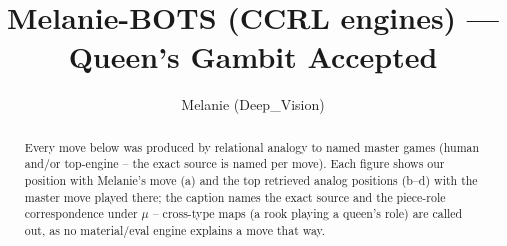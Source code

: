 \documentclass[11pt]{article}
\title{Melanie-BOTS (CCRL engines) — Queen's Gambit Accepted}
\author{Melanie (Deep\_Vision)}
\date{}
\begin{document}
\maketitle

\begin{abstract}Every move below was produced by relational analogy to named master games (human and/or top-engine -- the exact source is named per move). Each figure shows our position with Melanie's move (a) and the top retrieved analog positions (b--d) with the master move played there; the caption names the exact source and the piece-role correspondence under $\mu$ -- cross-type maps (a rook playing a queen's role) are called out, as no material/eval engine explains a move that way.\end{abstract}

\begin{figure}[p]\centering
\begin{subfigure}{0.46\textwidth}\centering
\resizebox{\linewidth}{!}{%
\newchessgame
\chessboard[
  setfen={rnbqkb1r/1p3ppp/p3pn2/2P5/2B5/4PN2/PP3PPP/RNBQ1RK1 b kq - 0 7},
  showmover=false,
  pgfstyle=straightmove, color=movearrow, markmove={f8-c5}
]}
\caption{}
\end{subfigure}\hfill
\begin{subfigure}{0.46\textwidth}\centering
\resizebox{\linewidth}{!}{%
\newchessgame
\chessboard[
  setfen={rnbqkb1r/1p3ppp/p3pn2/2P5/2B5/4PN2/PP3PPP/RNBQ1RK1 b kq - 0 7},
  showmover=false,
  pgfstyle=straightmove, color=movearrow, markmove={f8-c5}
]}
\caption{}
\end{subfigure}
\\[4pt]
\begin{subfigure}{0.46\textwidth}\centering
\resizebox{\linewidth}{!}{%
\newchessgame
\chessboard[
  setfen={rnbqkb1r/1p3ppp/p3pn2/2P5/2B5/4PN2/PP3PPP/RNBQ1RK1 b kq - 0 7},
  showmover=false,
  pgfstyle=straightmove, color=movearrow, markmove={f8-c5}
]}
\caption{}
\end{subfigure}\hfill
\begin{subfigure}{0.46\textwidth}\centering
\resizebox{\linewidth}{!}{%
\newchessgame
\chessboard[
  setfen={rnbqkb1r/1p3ppp/p3pn2/2P5/2B5/4PN2/PP3PPP/RNBQ1RK1 b kq - 0 7},
  showmover=false,
  pgfstyle=straightmove, color=movearrow, markmove={f8-c5}
]}
\caption{}
\end{subfigure}

\end{figure}
\end{document}
